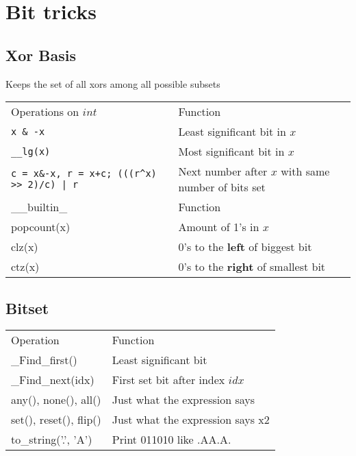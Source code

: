 \section{Bit tricks}
\vspace{-5pt}

\subsection{Xor Basis}
Keeps the set of all xors among all possible subsets \\

\begin{tabular}{ |p{3cm}|p{5cm}|  }
  \hline  
  \rowcolor{Blue} 
  \multicolumn{2}{|c|}{Bits++} \\
  \hline
  \rowcolor{LightBlue2} 
  Operations on $int$ & Function \\
  \hline
  \texttt{x \& -x} & Least significant bit in $x$ \\
  \rowcolor{Gray} 
  \texttt{\_\_lg(x)} & Most significant bit in $x$ \\
  \texttt{c = x\&-x, r = x+c; (((r\^{}x) >> 2)/c) | r} & Next number after $x$ with same number of bits set \\
  \hline

  \rowcolor{LightBlue2} 
  \_\_builtin\_ & Function \\
  \hline 
  popcount(x) & Amount of 1's in $x$ \\
  \rowcolor{Gray} 
  clz(x) & 0's to the \textbf{left} of biggest bit \\
  ctz(x) & 0's to the \textbf{right} of smallest bit \\
  \hline
\end{tabular}

\subsection{Bitset} 
\vspace{-5pt}

\begin{tabular}{ |p{3cm}|p{5cm}|  }
  \hline 
  \rowcolor{Blue} 
  \multicolumn{2}{|c|}{Bitset<Size>} \\
  \hline
  \rowcolor{LightBlue2} 
  Operation & Function \\
  \hline
  \_Find\_first() & Least significant bit \\
  \rowcolor{Gray} 
  \_Find\_next(idx) & First set bit after index $idx$ \\
  any(), none(), all() & Just what the expression says \\
  \rowcolor{Gray} 
  set(), reset(), flip() & Just what the expression says x2 \\
  to\_string('.', 'A') & Print 011010 like .AA.A. \\
  \hline
\end{tabular}

% 

